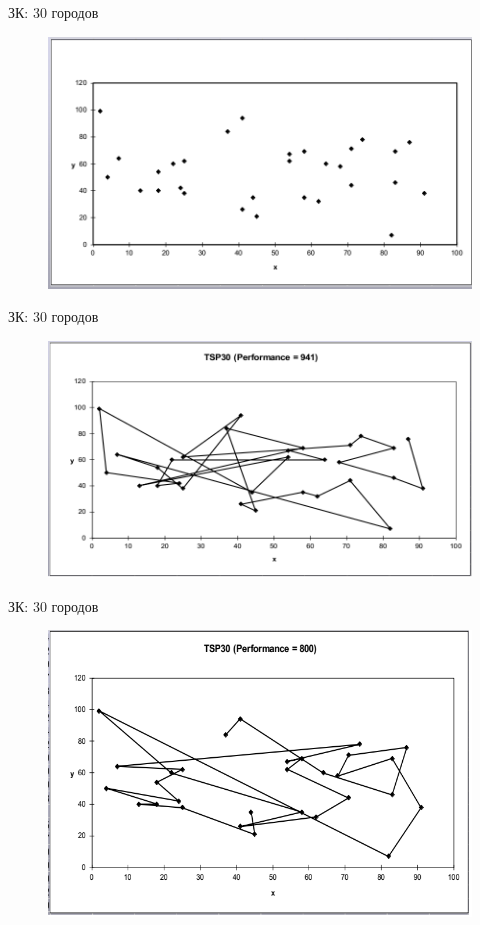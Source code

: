 \documentclass{beamer}
\begin{document}
\begin{frame}{ЗК: 30 городов}
\begin{figure}[h]
\centering
\includegraphics[scale=0.4]{images/lec04-pic43.png}
\end{figure}
\end{frame}

\begin{frame}{ЗК: 30 городов}
\begin{figure}[h]
\centering
\includegraphics[scale=0.4]{images/lec04-pic44.png}
\end{figure}
\end{frame}

\begin{frame}{ЗК: 30 городов}
\begin{figure}[h]
\centering
\includegraphics[scale=0.4]{images/lec04-pic45.png}
\end{figure}
\end{frame}
\end{document}
